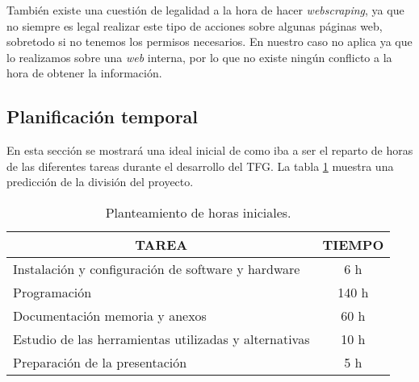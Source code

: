 También existe una cuestión de legalidad a la hora de hacer \emph{webscraping}, ya que no siempre es legal realizar este tipo de acciones sobre algunas páginas web, sobretodo si no tenemos los permisos necesarios. En nuestro caso no aplica ya que lo realizamos sobre una \emph{web} interna, por lo que no existe ningún conflicto a la hora de obtener la información.

\subsection{Planificación temporal}

En esta sección se mostrará una ideal inicial de como iba a ser el reparto de horas de las diferentes tareas durante el desarrollo del TFG. La tabla \ref{horas} muestra una predicción de la división del proyecto.

\begin{table}[]
	\label{horas}
	\centering
	\begin{tabular}{|l|c|}
		\hline
		\multicolumn{1}{|c|}{\textbf{TAREA}}     & \textbf{TIEMPO} \\ \hline
		Instalación y configuración de software y hardware & 6 h  \\ \hline
		Programación                            & 140 h         \\ \hline
		Documentación memoria y anexos          & 60 h          \\ \hline
		Estudio de las herramientas utilizadas y alternativas & 10 h \\ \hline
			Preparación de la presentación		    & 5 h           \\ \hline
	\end{tabular}
	\caption{Planteamiento de horas iniciales.}
\end{table}
